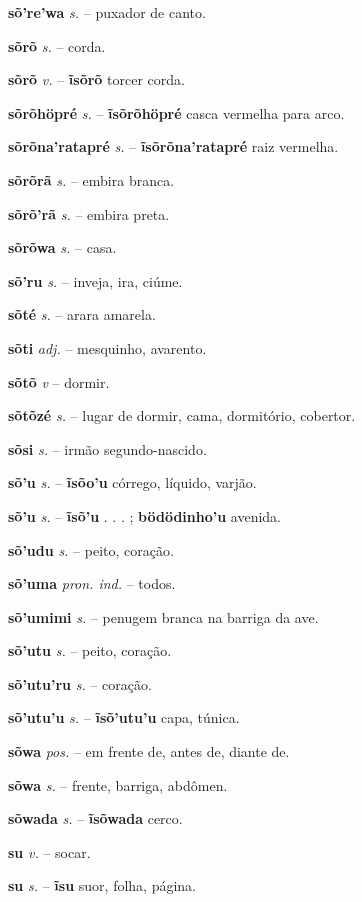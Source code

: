 \textbf{sõ're'wa} \textit{s.} -- puxador de canto.

\textbf{sõrõ} \textit{s.} -- corda.

\textbf{sõrõ} \textit{v.} -- \textbf{ĩsõrõ} torcer corda.

\textbf{sõrõhöpré} \textit{s.} -- \textbf{ĩsõrõhöpré} casca vermelha para arco.

\textbf{sõrõna'ratapré} \textit{s.} -- \textbf{ĩsõrõna'ratapré} raiz vermelha.

\textbf{sõrõrã} \textit{s.} -- embira branca.

\textbf{sõrõ'rã} \textit{s.} -- embira preta.

\textbf{sõrõwa} \textit{s.} -- casa.

\textbf{sõ'ru} \textit{s.} -- inveja, ira, ciúme.

\textbf{sõté} \textit{s.} -- arara amarela.

\textbf{sõti} \textit{adj.} -- mesquinho, avarento.

\textbf{sõtõ} \textit{v} -- dormir.

\textbf{sõtõzé} \textit{s.} -- lugar de dormir, cama, dormitório, cobertor.

\textbf{sõsi} \textit{s.} -- irmão segundo-nascido.

\textbf{sõ'u} \textit{s.} -- \textbf{ĩsõo'u} córrego, líquido, varjão.

\textbf{sõ'u} \textit{s.} -- \textbf{ĩsõ'u} . . . ; \textbf{bödödinho'u} avenida.

\textbf{sõ'udu} \textit{s.} -- peito, coração.

\textbf{sõ'uma} \textit{pron. ind.} -- todos.

\textbf{sõ'umimi} \textit{s.} -- penugem branca na barriga da ave.

\textbf{sõ'utu} \textit{s.} -- peito, coração.

\textbf{sõ'utu'ru} \textit{s.} -- coração.

\textbf{sõ'utu'u} \textit{s.} -- \textbf{ĩsõ'utu'u} capa, túnica.

\textbf{sõwa} \textit{pos.} -- em frente de, antes de, diante de.

\textbf{sõwa} \textit{s.} -- frente, barriga, abdômen.

\textbf{sõwada} \textit{s.} -- \textbf{ĩsõwada} cerco.

\textbf{su} \textit{v.} -- socar.

\textbf{su} \textit{s.} -- \textbf{ĩsu} suor, folha, página.

